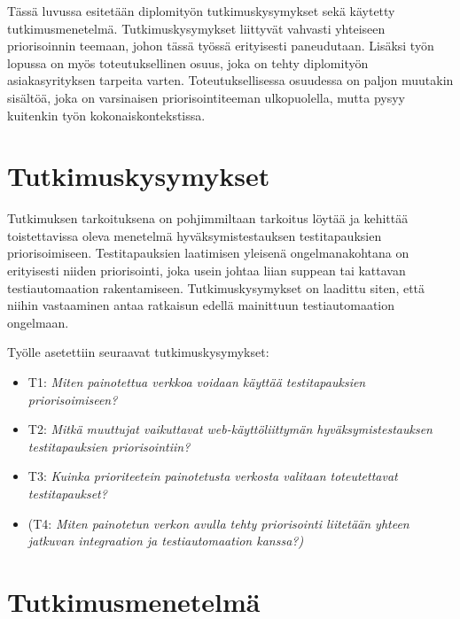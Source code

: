 Tässä luvussa esitetään diplomityön tutkimuskysymykset sekä käytetty tutkimusmenetelmä.
Tutkimuskysymykset liittyvät vahvasti yhteiseen priorisoinnin teemaan, johon tässä työssä erityisesti paneudutaan.
Lisäksi työn lopussa on myös toteutuksellinen osuus, joka on tehty diplomityön asiakasyrityksen tarpeita varten.
Toteutuksellisessa osuudessa on paljon muutakin sisältöä, joka on varsinaisen priorisointiteeman ulkopuolella, mutta pysyy kuitenkin työn kokonaiskontekstissa.

\section{Tutkimuskysymykset}

Tutkimuksen tarkoituksena on pohjimmiltaan tarkoitus löytää ja kehittää toistettavissa oleva menetelmä hyväksymistestauksen testitapauksien priorisoimiseen.
Testitapauksien laatimisen yleisenä ongelmanakohtana on erityisesti niiden priorisointi, joka usein johtaa liian suppean tai kattavan testiautomaation rakentamiseen.
Tutkimuskysymykset on laadittu siten, että niihin vastaaminen antaa ratkaisun edellä mainittuun testiautomaation ongelmaan.

Työlle asetettiin seuraavat tutkimuskysymykset:
\begin{itemize}
  \item T1: \emph{Miten painotettua verkkoa voidaan käyttää testitapauksien priorisoimiseen?}
  \item T2: \emph{Mitkä muuttujat vaikuttavat web-käyttöliittymän hyväksymistestauksen testitapauksien priorisointiin?}
  \item T3: \emph{Kuinka prioriteetein painotetusta verkosta valitaan toteutettavat testitapaukset?}
  \item (T4: \emph{Miten painotetun verkon avulla tehty priorisointi liitetään yhteen jatkuvan integraation ja testiautomaation kanssa?)}
\end{itemize}

\section{Tutkimusmenetelmä}

